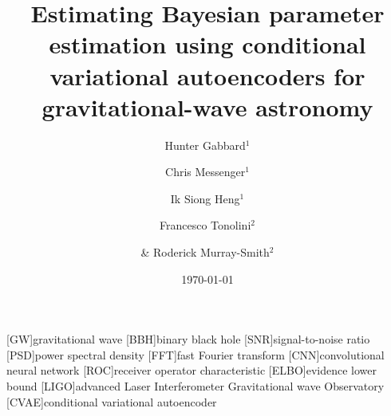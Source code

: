 \documentclass[%
showpacs,
 amsmath,amssymb,
 aps,
 twocolumn,
 prl,
 reprint,
floatfix,
]{revtex4-1}
\begin{document}

\title{Estimating Bayesian parameter estimation using conditional variational
autoencoders for gravitational-wave astronomy}

\author{Hunter Gabbard$^1$}
\author{Chris Messenger$^1$}
\author{Ik Siong Heng$^1$}
\author{Francesco Tonolini$^2$}
\author{\& Roderick Murray-Smith$^2$}


\date{\today}

\maketitle

[GW]{gravitational wave}
[BBH]{binary black hole}
[SNR]{signal-to-noise ratio}
[PSD]{power spectral density}
[FFT]{fast Fourier transform}
[CNN]{convolutional neural network}
[ROC]{receiver operator characteristic}
[ELBO]{evidence lower bound}
[LIGO]{advanced Laser Interferometer Gravitational wave Observatory}
[CVAE]{conditional variational autoencoder}
\end{document}
